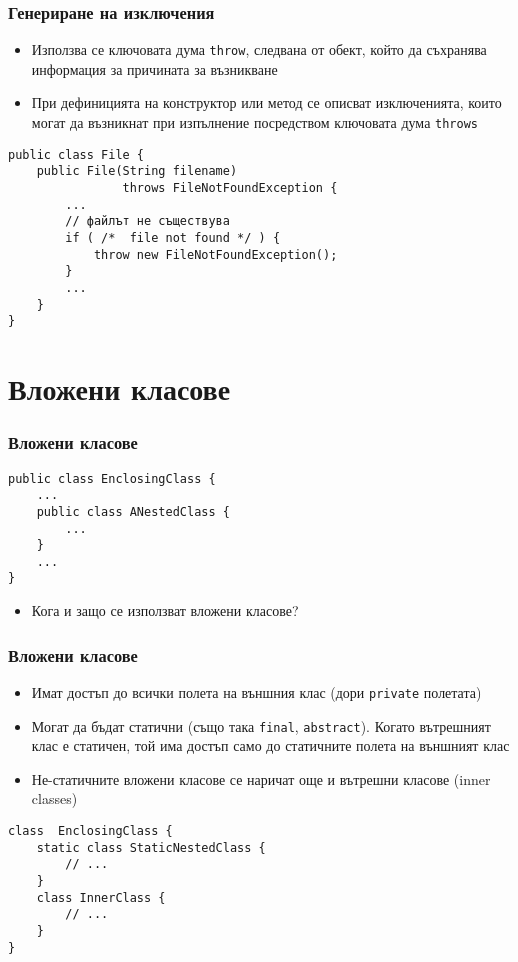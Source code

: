 \documentclass[ignorenonframetext, hyperref=unicode,compress,pdflatex]{beamer}
\begin{document}
\begin{frame}[containsverbatim]\frametitle{Генериране на изключения}
\begin{itemize}
\item Използва се ключовата дума \lstinline{throw}, следвана от обект, който да съхранява информация за причината за възникване
\item При дефиницията на конструктор или метод се описват изключенията, които могат да възникнат при изпълнение посредством ключовата дума \lstinline{throws}
\end{itemize}
\begin{lstlisting}
public class File {
 	public File(String filename) 
				throws FileNotFoundException {
		...
 		// файлът не съществува
 		if ( /*  file not found */ ) {
 			throw new FileNotFoundException();
		}
		...
	}
}
\end{lstlisting}
\end{frame}


\section{Вложени класове}

\begin{frame}[containsverbatim]\frametitle{Вложени класове}
\begin{lstlisting}
public class EnclosingClass {
	...
	public class ANestedClass {
		...
	}
	...
}
\end{lstlisting}
\begin{itemize}
\item Кога и защо се използват вложени класове?
\end{itemize}

\end{frame}


\begin{frame}[containsverbatim]\frametitle{Вложени класове}
\begin{itemize}
\item Имат достъп до всички полета на външния клас (дори \lstinline{private} полетата)
\item Могат да бъдат статични (също така \lstinline{final}, \lstinline{abstract}). Когато вътрешният клас е статичен, той има достъп само до статичните полета на външният клас
\item Не-статичните вложени класове се наричат още и вътрешни класове (inner classes)
\end{itemize}
\begin{lstlisting}
class  EnclosingClass {
 	static class StaticNestedClass {
		// ...
	}
 	class InnerClass {
		// ...
	}
}
\end{lstlisting}
\end{frame}
\end{document}
